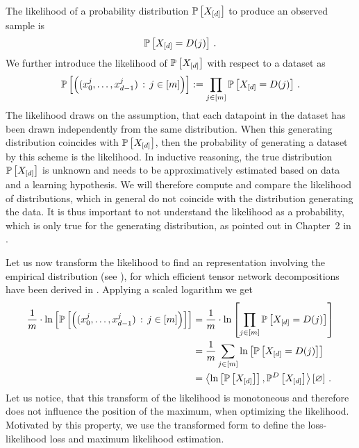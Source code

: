 The likelihood of a probability distribution $\mathbb{P}\left[X_{[d]}\right]$ to produce an observed sample is
\begin{align*}
    \mathbb{P}\left[X_{[d]} = D(j)\right] \, .
\end{align*}
We further introduce the likelihood of $\mathbb{P}\left[X_{[d]}\right]$ with respect to a dataset as
\begin{align*}
    \mathbb{P}\left[\left(({x_{0}^{j},\ldots,x_{d-1}^{j}})\,:\,j\in[m]\right)\right] := \prod_{j\in[m]} \mathbb{P}\left[X_{[d]} = D(j)\right] \, .
\end{align*}
The likelihood draws on the assumption, that each datapoint in the dataset has been drawn independently from the same distribution.
When this generating distribution coincides with $\mathbb{P}\left[X_{[d]}\right]$, then the probability of generating a dataset by this scheme is the likelihood.
In inductive reasoning, the true distribution $\mathbb{P}\left[X_{[d]}\right]$ is unknown and needs to be approximatively estimated based on data and a learning hypothesis.
We will therefore compute and compare the likelihood of distributions, which in general do not coincide with the distribution generating the data.
It is thus important to not understand the likelihood as a probability, which is only true for the generating distribution, as pointed out in Chapter~2 in \cite{mackay_information_2003}.

Let us now transform the likelihood to find an representation involving the empirical distribution (see ), for which efficient tensor network decompositions have been derived in .
Applying a scaled logarithm we get
\begin{align*}
    \frac{1}{m} \cdot \ln \left[ \mathbb{P}\left[\left(({x_{0}^{j},\ldots,x_{d-1}^{j}})\,:\,j\in[m]\right)\right] \right]
    &= \frac{1}{m} \cdot \ln \left[ \prod_{j\in[m]} \mathbb{P}\left[X_{[d]} = D(j)\right] \right] \\
    &= \frac{1}{m}\sum_{j\in[m]} \ln \left[ \mathbb{P}\left[X_{[d]} = D(j)\right] \right] \\
    &= \left\langle \ln \left[ \mathbb{P}\left[X_{[d]}\right] \right],\mathbb{P}^{D}\left[X_{[d]}\right]\right\rangle \left[ \varnothing \right] \, .
\end{align*}
Let us notice, that this transform of the likelihood is monotoneous and therefore does not influence the position of the maximum, when optimizing the likelihood.
Motivated by this property, we use the transformed form to define the loss-likelihood loss and maximum likelihood estimation.

